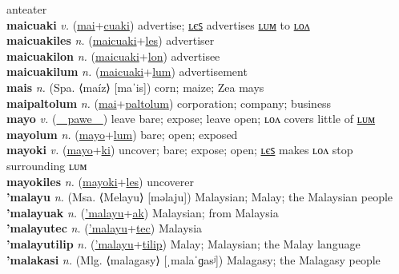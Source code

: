 anteater \label{maihnyamamamul} \\
\textbf{maicuaki} \textit{v.} (\hyperref[mai]{mai}+\hyperref[cuaki]{cuaki})
advertise; \hyperref[maicuakiles]{ʟєꜱ} advertises \hyperref[maicuakilum]{ʟᴜᴍ} to \hyperref[maicuakilon]{ʟᴏᴧ} \label{maicuaki} \\
\textbf{maicuakiles} \textit{n.} (\hyperref[maicuaki]{maicuaki}+\hyperref[les]{les})
advertiser \label{maicuakiles} \\
\textbf{maicuakilon} \textit{n.} (\hyperref[maicuaki]{maicuaki}+\hyperref[lon]{lon})
advertisee \label{maicuakilon} \\
\textbf{maicuakilum} \textit{n.} (\hyperref[maicuaki]{maicuaki}+\hyperref[lum]{lum})
advertisement \label{maicuakilum} \\
\textbf{mais} \textit{n.} (Spa. ⟨maíz⟩ [maˈis])
corn; maize; Zea mays \label{mais} \\
\textbf{maipaltolum} \textit{n.} (\hyperref[mai]{mai}+\hyperref[paltolum]{paltolum})
corporation; company; business \label{maipaltolum} \\
\textbf{mayo} \textit{v.} (\hyperref[pawe]{~~pawe~~})
leave bare; expose; leave open; ʟᴏᴧ covers little of \hyperref[mayolum]{ʟᴜᴍ} \label{mayo} \\
\textbf{mayolum} \textit{n.} (\hyperref[mayo]{mayo}+\hyperref[lum]{lum})
bare; open; exposed \label{mayolum} \\
\textbf{mayoki} \textit{v.} (\hyperref[mayo]{mayo}+\hyperref[ki]{ki})
uncover; bare; expose; open; \hyperref[mayokiles]{ʟєꜱ} makes ʟᴏᴧ stop surrounding ʟᴜᴍ \label{mayoki} \\
\textbf{mayokiles} \textit{n.} (\hyperref[mayoki]{mayoki}+\hyperref[les]{les})
uncoverer \label{mayokiles} \\
\textbf{'malayu} \textit{n.} (Msa. ⟨Melayu⟩ [məlaju])
Malaysian; Malay; the Malaysian people \label{'malayu} \\
\textbf{'malayuak} \textit{n.} (\hyperref['malayu]{'malayu}+\hyperref[ak]{ak})
Malaysian; from Malaysia \label{'malayuak} \\
\textbf{'malayutec} \textit{n.} (\hyperref['malayu]{'malayu}+\hyperref[tec]{tec})
Malaysia \label{'malayutec} \\
\textbf{'malayutilip} \textit{n.} (\hyperref['malayu]{'malayu}+\hyperref[tilip]{tilip})
Malay; Malaysian; the Malay language \label{'malayutilip} \\
\textbf{'malakasi} \textit{n.} (Mlg. ⟨malagasy⟩ [ˌmalaˈɡasʲ])
Malagasy; the Malagasy people \label{'malakasi} \\
